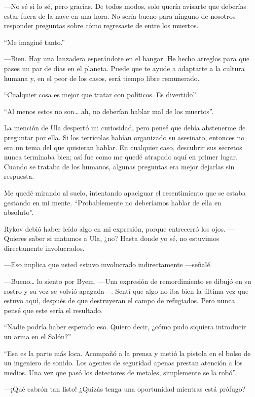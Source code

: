 —No sé si lo sé, pero gracias. De todos modos, solo quería avisarte que deberías estar fuera de la nave en una hora. No sería bueno para ninguno de nosotros responder preguntas sobre cómo regresaste de entre los muertos.

``Me imaginé tanto.''

—Bien. Hay una lanzadera esperándote en el hangar. He hecho arreglos para que pases un par de días en el planeta. Puede que te ayude a adaptarte a la cultura humana y, en el peor de los casos, será tiempo libre remunerado.

``Cualquier cosa es mejor que tratar con políticos. Es divertido''.

``Al menos estos no son… ah, no deberían hablar mal de los muertos''.

La mención de Ula despertó mi curiosidad, pero pensé que debía abstenerme de preguntar por ella. Si los terrícolas habían organizado su asesinato, entonces no era un tema del que quisieran hablar. En cualquier caso, descubrir sus secretos nunca terminaba bien; así fue como me quedé atrapado aquí en primer lugar. Cuando se trataba de los humanos, algunas preguntas era mejor dejarlas sin respuesta.

Me quedé mirando al suelo, intentando apaciguar el resentimiento que se estaba gestando en mi mente. ``Probablemente no deberíamos hablar de ella en absoluto''.

Rykov debió haber leído algo en mi expresión, porque entrecerró los ojos. —Quieres saber si matamos a Ula, ¿no? Hasta donde yo sé, no estuvimos directamente involucrados.

—Eso implica que usted estuvo involucrado indirectamente —señalé.

—Bueno… lo siento por Byem. —Una expresión de remordimiento se dibujó en su rostro y su voz se volvió apagada—. Sentí que algo no iba bien la última vez que estuvo aquí, después de que destruyeran el campo de refugiados. Pero nunca pensé que este sería el resultado.

``Nadie podría haber esperado eso. Quiero decir, ¿cómo pudo siquiera introducir un arma en el Salón?''

``Esa es la parte más loca. Acompañó a la prensa y metió la pistola en el bolso de un ingeniero de sonido. Los agentes de seguridad apenas prestan atención a los medios. Una vez que pasó los detectores de metales, simplemente se la robó''.

—¡Qué cabrón tan listo! ¿Quizás tenga una oportunidad mientras está prófugo?

